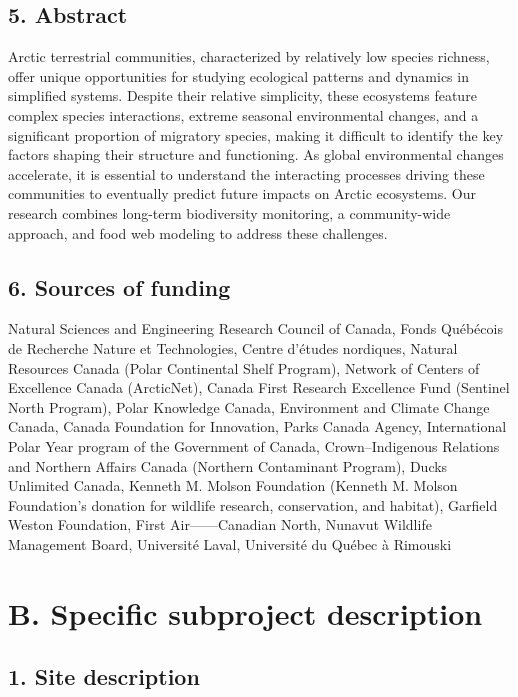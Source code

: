 \documentclass[a4paper,twoside,12pt]{article}
\begin{document}
     \subsection*{5. Abstract}
Arctic terrestrial communities, characterized by relatively low species richness, offer unique opportunities for studying ecological patterns and dynamics in simplified systems. Despite their relative simplicity, these ecosystems feature complex species interactions, extreme seasonal environmental changes, and a significant proportion of migratory species, making it difficult to identify the key factors shaping their structure and functioning. As global environmental changes accelerate, it is essential to understand the interacting processes driving these communities to eventually predict future impacts on Arctic ecosystems. Our research combines long-term biodiversity monitoring, a community-wide approach, and food web modeling to address these challenges.
       
      \subsection*{6. Sources of funding}
Natural Sciences and Engineering Research Council of Canada, Fonds Québécois de Recherche Nature et Technologies, Centre d'études nordiques, Natural Resources Canada (Polar Continental Shelf Program), Network of Centers of Excellence Canada (ArcticNet), Canada First Research Excellence Fund (Sentinel North Program), Polar Knowledge Canada, Environment and Climate Change Canada, Canada Foundation for Innovation, Parks Canada Agency, International Polar Year program of the Government of Canada, Crown–Indigenous Relations and Northern Affairs Canada (Northern Contaminant Program), Ducks Unlimited Canada, Kenneth M. Molson Foundation (Kenneth M. Molson Foundation’s donation for wildlife research, conservation, and habitat), Garfield Weston Foundation, First Air——Canadian North, Nunavut Wildlife Management Board, Université Laval, Université du Québec à Rimouski
\newpage
        
    \section*{B. Specific subproject description}
        \subsection*{1. Site description}
\end{document}
